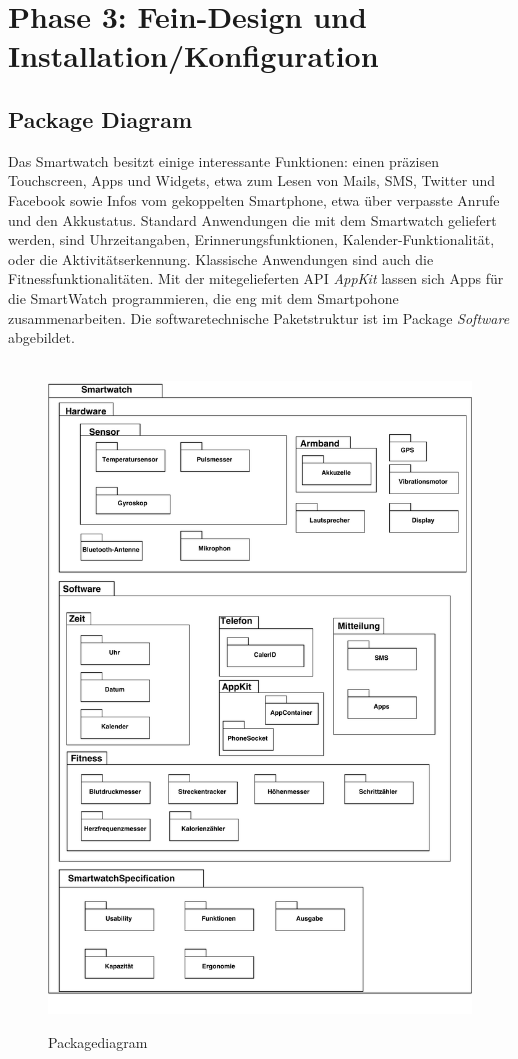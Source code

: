 \chapter{Phase 3: Fein-Design und Installation/Konfiguration}

\section{Package Diagram}
Das Smartwatch besitzt einige interessante Funktionen: einen präzisen Touchscreen, Apps und Widgets, etwa zum Lesen von Mails, SMS, Twitter und Facebook sowie Infos vom gekoppelten Smartphone, etwa über verpasste Anrufe und den Akkustatus.
Standard Anwendungen die mit dem Smartwatch geliefert werden, sind Uhrzeitangaben, Erinnerungsfunktionen, Kalender-Funktionalität, oder die Aktivitätserkennung.
Klassische Anwendungen sind auch die Fitnessfunktionalitäten.
Mit der mitegelieferten API \textit{AppKit} lassen sich Apps für die SmartWatch programmieren, die eng mit dem Smartpohone zusammenarbeiten.
Die softwaretechnische Paketstruktur ist im Package \textit{Software} abgebildet.

\begin{figure}[h]
\centering\
\includegraphics[width=\textwidth]{img/PackagePhase2}
\caption{Packagediagram}\label{fig:package}
\end{figure}

